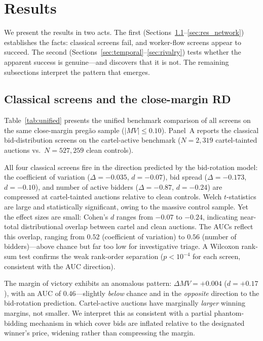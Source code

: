 \section{Results}\label{res}

We present the results in two acts. The first (Sections~\ref{sec:res_classical}--\ref{sec:res_network}) establishes the facts: classical screens fail, and worker-flow screens appear to succeed. The second (Sections~\ref{sec:temporal}--\ref{sec:rivalry}) tests whether the apparent success is genuine---and discovers that it is not. The remaining subsections interpret the pattern that emerges.


\subsection{Classical screens and the close-margin RD}\label{sec:res_classical}

Table~\ref{tab:unified} presents the unified benchmark comparison of all screens on the same close-margin pregão sample ($\lvert MV \rvert \le 0.10$). Panel~A reports the classical bid-distribution screens on the cartel-active benchmark ($N = 2{,}319$ cartel-tainted auctions vs.\ $N = 527{,}259$ clean controls).

All four classical screens fire in the direction predicted by the bid-rotation model: the coefficient of variation ($\Delta = -0.035$, $d = -0.07$), bid spread ($\Delta = -0.173$, $d = -0.10$), and number of active bidders ($\Delta = -0.87$, $d = -0.24$) are compressed at cartel-tainted auctions relative to clean controls. Welch $t$-statistics are large and statistically significant, owing to the massive control sample. Yet the effect sizes are small: Cohen's $d$ ranges from $-0.07$ to $-0.24$, indicating near-total distributional overlap between cartel and clean auctions. The AUCs reflect this overlap, ranging from $0.52$ (coefficient of variation) to $0.56$ (number of bidders)---above chance but far too low for investigative triage. A Wilcoxon rank-sum test confirms the weak rank-order separation ($p < 10^{-4}$ for each screen, consistent with the AUC direction).

The margin of victory exhibits an anomalous pattern: $\Delta MV = +0.004$ ($d = +0.17$), with an AUC of $0.46$---slightly \emph{below} chance and in the \emph{opposite} direction to the bid-rotation prediction. Cartel-active auctions have marginally \emph{larger} winning margins, not smaller. We interpret this as consistent with a partial phantom-bidding mechanism in which cover bids are inflated relative to the designated winner's price, widening rather than compressing the margin.

